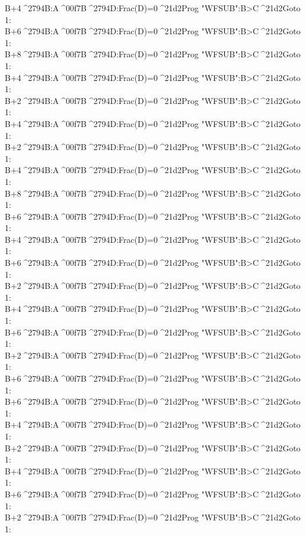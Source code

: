 \documentclass[11pt,letterpaper]{article}
\newcommand{\STO}{{\large ^^^^2794}}
\newcommand{\CBR}{{\Large ^^^^21d2}}
\newcommand{\DIV}{^^^^00f7}
\newcommand{\IDENT}[1]{\hspace*{#1\BaseIndent}}
\begin{document}
\begin{linenumbers}
\IDENT{1}B+4\STO B:A\DIV B\STO D:Frac(D)=0\CBR Prog "WFSUB":B>C\CBR Goto 1:\\
\IDENT{1}B+6\STO B:A\DIV B\STO D:Frac(D)=0\CBR Prog "WFSUB":B>C\CBR Goto 1:\\
\IDENT{1}B+8\STO B:A\DIV B\STO D:Frac(D)=0\CBR Prog "WFSUB":B>C\CBR Goto 1:\\
\IDENT{1}B+4\STO B:A\DIV B\STO D:Frac(D)=0\CBR Prog "WFSUB":B>C\CBR Goto 1:\\
\IDENT{1}B+2\STO B:A\DIV B\STO D:Frac(D)=0\CBR Prog "WFSUB":B>C\CBR Goto 1:\\
\IDENT{1}B+4\STO B:A\DIV B\STO D:Frac(D)=0\CBR Prog "WFSUB":B>C\CBR Goto 1:\\
\IDENT{1}B+2\STO B:A\DIV B\STO D:Frac(D)=0\CBR Prog "WFSUB":B>C\CBR Goto 1:\\
\IDENT{1}B+4\STO B:A\DIV B\STO D:Frac(D)=0\CBR Prog "WFSUB":B>C\CBR Goto 1:\\
\IDENT{1}B+8\STO B:A\DIV B\STO D:Frac(D)=0\CBR Prog "WFSUB":B>C\CBR Goto 1:\\
\IDENT{1}B+6\STO B:A\DIV B\STO D:Frac(D)=0\CBR Prog "WFSUB":B>C\CBR Goto 1:\\
\IDENT{1}B+4\STO B:A\DIV B\STO D:Frac(D)=0\CBR Prog "WFSUB":B>C\CBR Goto 1:\\
\IDENT{1}B+6\STO B:A\DIV B\STO D:Frac(D)=0\CBR Prog "WFSUB":B>C\CBR Goto 1:\\
\IDENT{1}B+2\STO B:A\DIV B\STO D:Frac(D)=0\CBR Prog "WFSUB":B>C\CBR Goto 1:\\
\IDENT{1}B+4\STO B:A\DIV B\STO D:Frac(D)=0\CBR Prog "WFSUB":B>C\CBR Goto 1:\\
\IDENT{1}B+6\STO B:A\DIV B\STO D:Frac(D)=0\CBR Prog "WFSUB":B>C\CBR Goto 1:\\
\IDENT{1}B+2\STO B:A\DIV B\STO D:Frac(D)=0\CBR Prog "WFSUB":B>C\CBR Goto 1:\\
\IDENT{1}B+6\STO B:A\DIV B\STO D:Frac(D)=0\CBR Prog "WFSUB":B>C\CBR Goto 1:\\
\IDENT{1}B+6\STO B:A\DIV B\STO D:Frac(D)=0\CBR Prog "WFSUB":B>C\CBR Goto 1:\\
\IDENT{1}B+4\STO B:A\DIV B\STO D:Frac(D)=0\CBR Prog "WFSUB":B>C\CBR Goto 1:\\
\IDENT{1}B+2\STO B:A\DIV B\STO D:Frac(D)=0\CBR Prog "WFSUB":B>C\CBR Goto 1:\\
\IDENT{1}B+4\STO B:A\DIV B\STO D:Frac(D)=0\CBR Prog "WFSUB":B>C\CBR Goto 1:\\
\IDENT{1}B+6\STO B:A\DIV B\STO D:Frac(D)=0\CBR Prog "WFSUB":B>C\CBR Goto 1:\\
\IDENT{1}B+2\STO B:A\DIV B\STO D:Frac(D)=0\CBR Prog "WFSUB":B>C\CBR Goto 1:\\

\end{linenumbers}
\end{document}
